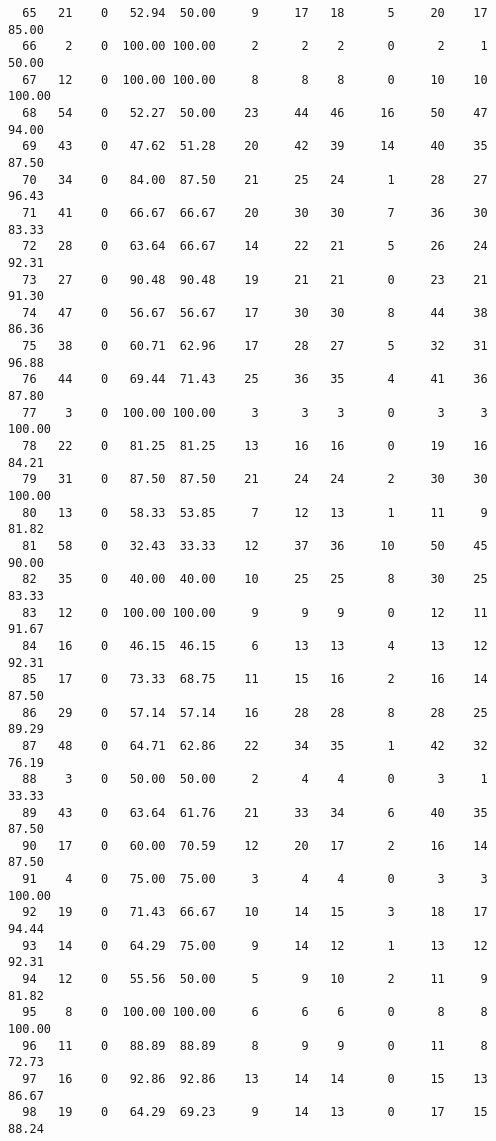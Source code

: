 \begin{verbatim}
  65   21    0   52.94  50.00     9     17   18      5     20    17    85.00
  66    2    0  100.00 100.00     2      2    2      0      2     1    50.00
  67   12    0  100.00 100.00     8      8    8      0     10    10   100.00
  68   54    0   52.27  50.00    23     44   46     16     50    47    94.00
  69   43    0   47.62  51.28    20     42   39     14     40    35    87.50
  70   34    0   84.00  87.50    21     25   24      1     28    27    96.43
  71   41    0   66.67  66.67    20     30   30      7     36    30    83.33
  72   28    0   63.64  66.67    14     22   21      5     26    24    92.31
  73   27    0   90.48  90.48    19     21   21      0     23    21    91.30
  74   47    0   56.67  56.67    17     30   30      8     44    38    86.36
  75   38    0   60.71  62.96    17     28   27      5     32    31    96.88
  76   44    0   69.44  71.43    25     36   35      4     41    36    87.80
  77    3    0  100.00 100.00     3      3    3      0      3     3   100.00
  78   22    0   81.25  81.25    13     16   16      0     19    16    84.21
  79   31    0   87.50  87.50    21     24   24      2     30    30   100.00
  80   13    0   58.33  53.85     7     12   13      1     11     9    81.82
  81   58    0   32.43  33.33    12     37   36     10     50    45    90.00
  82   35    0   40.00  40.00    10     25   25      8     30    25    83.33
  83   12    0  100.00 100.00     9      9    9      0     12    11    91.67
  84   16    0   46.15  46.15     6     13   13      4     13    12    92.31
  85   17    0   73.33  68.75    11     15   16      2     16    14    87.50
  86   29    0   57.14  57.14    16     28   28      8     28    25    89.29
  87   48    0   64.71  62.86    22     34   35      1     42    32    76.19
  88    3    0   50.00  50.00     2      4    4      0      3     1    33.33
  89   43    0   63.64  61.76    21     33   34      6     40    35    87.50
  90   17    0   60.00  70.59    12     20   17      2     16    14    87.50
  91    4    0   75.00  75.00     3      4    4      0      3     3   100.00
  92   19    0   71.43  66.67    10     14   15      3     18    17    94.44
  93   14    0   64.29  75.00     9     14   12      1     13    12    92.31
  94   12    0   55.56  50.00     5      9   10      2     11     9    81.82
  95    8    0  100.00 100.00     6      6    6      0      8     8   100.00
  96   11    0   88.89  88.89     8      9    9      0     11     8    72.73
  97   16    0   92.86  92.86    13     14   14      0     15    13    86.67
  98   19    0   64.29  69.23     9     14   13      0     17    15    88.24

\end{verbatim}
